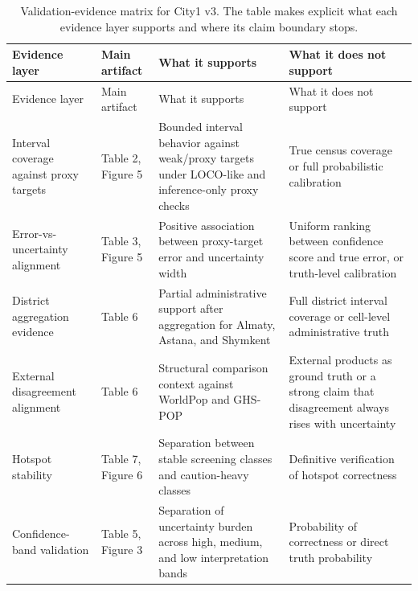 \begin{longtable}{L{2.7cm}L{3.2cm}L{4.3cm}L{4.3cm}}
\caption{Validation-evidence matrix for City1 v3. The table makes explicit what each evidence layer supports and where its claim boundary stops.}\label{tab:s1-validation-evidence}\\
\toprule
Evidence layer & Main artifact & What it supports & What it does not support \\
\midrule
\endfirsthead
\toprule
Evidence layer & Main artifact & What it supports & What it does not support \\
\midrule
\endhead
Interval coverage against proxy targets & Table 2, Figure 5 & Bounded interval behavior against weak/proxy targets under LOCO-like and inference-only proxy checks & True census coverage or full probabilistic calibration \\
Error-vs-uncertainty alignment & Table 3, Figure 5 & Positive association between proxy-target error and uncertainty width & Uniform ranking between confidence score and true error, or truth-level calibration \\
District aggregation evidence & Table 6 & Partial administrative support after aggregation for Almaty, Astana, and Shymkent & Full district interval coverage or cell-level administrative truth \\
External disagreement alignment & Table 6 & Structural comparison context against WorldPop and GHS-POP & External products as ground truth or a strong claim that disagreement always rises with uncertainty \\
Hotspot stability & Table 7, Figure 6 & Separation between stable screening classes and caution-heavy classes & Definitive verification of hotspot correctness \\
Confidence-band validation & Table 5, Figure 3 & Separation of uncertainty burden across high, medium, and low interpretation bands & Probability of correctness or direct truth probability \\
\bottomrule
\end{longtable}

